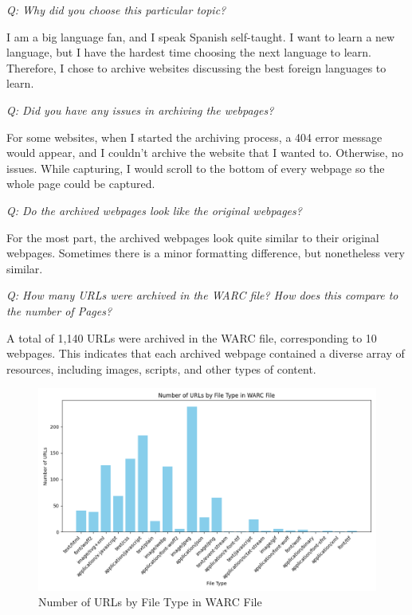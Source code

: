 \documentclass[12pt]{article}
\begin{document}
\emph{Q: Why did you choose this particular topic?}

I am a big language fan, and I speak Spanish self-taught. I want to learn a new language, but I have the hardest time choosing the next language to learn. Therefore, I chose to archive websites discussing the best foreign languages to learn. 

\emph{Q: Did you have any issues in archiving the webpages?}

For some websites, when I started the archiving process, a 404 error message would appear, and I couldn't archive the website that I wanted to. Otherwise, no issues. While capturing, I would scroll to the bottom of every webpage so the whole page could be captured.

\emph{Q: Do the archived webpages look like the original webpages?}

For the most part, the archived webpages look quite similar to their original webpages. Sometimes there is a minor formatting difference, but nonetheless very similar.

\emph{Q: How many URLs were archived in the WARC file? How does this compare to the number of Pages?}

A total of 1,140 URLs were archived in the WARC file, corresponding to 10 webpages. This indicates that each archived webpage contained a diverse array of resources, including images, scripts, and other types of content.

\begin{figure}[h!]
    \centering
    \includegraphics[trim=0 0 0 0, clip, width=\textwidth] {Q2.png}
    \caption{Number of URLs by File Type in WARC File}
    \label{fig:q2}
\end{figure}
\end{document}
